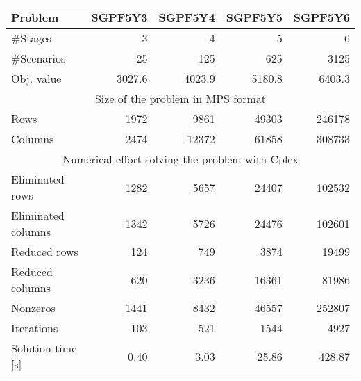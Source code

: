 \bigskip

\begin{center}
\begin{tabular}{|l|r|r|r|r|} \hline
Problem            & SGPF5Y3 & SGPF5Y4 & SGPF5Y5 & SGPF5Y6 \\ \hline
\#Stages           &     3   &     4   &     5   &     6 \\
\#Scenarios        &    25   &   125   &   625   &  3125 \\
Obj. value         &  3027.6 &  4023.9 &  5180.8 &  6403.3 \\ \hline
\multicolumn{5}{|c|}{Size of the problem in MPS format} \\ \hline
Rows               &    1972 &    9861 &   49303 &  246178 \\
Columns            &    2474 &   12372 &   61858 &  308733 \\ \hline
\multicolumn{5}{|c|}{Numerical effort solving the problem with Cplex} \\ \hline
Eliminated rows    &    1282 &    5657 &   24407 &  102532 \\
Eliminated columns &    1342 &    5726 &   24476 &  102601 \\
Reduced rows       &     124 &     749 &    3874 &   19499 \\
Reduced columns    &     620 &    3236 &   16361 &   81986 \\
Nonzeros           &    1441 &    8432 &   46557 &  252807 \\
Iterations         &     103 &     521 &    1544 &    4927 \\
Solution time [s]  &    0.40 &    3.03 &   25.86 &  428.87 \\ \hline
\end{tabular}
\end{center}

\bigskip
\noindent



